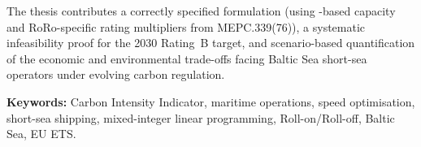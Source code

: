 The thesis contributes a correctly specified \RoRo{} \CII{} formulation (using
\GT{}-based capacity and RoRo-specific rating multipliers from MEPC.339(76)),
a systematic infeasibility proof for the 2030 Rating~B target, and
scenario-based quantification of the economic and environmental trade-offs
facing Baltic Sea short-sea operators under evolving carbon regulation.

\medskip
\noindent\textbf{Keywords:} Carbon Intensity Indicator, maritime operations,
speed optimisation, short-sea shipping, mixed-integer linear programming,
Roll-on/Roll-off, Baltic Sea, EU ETS.
